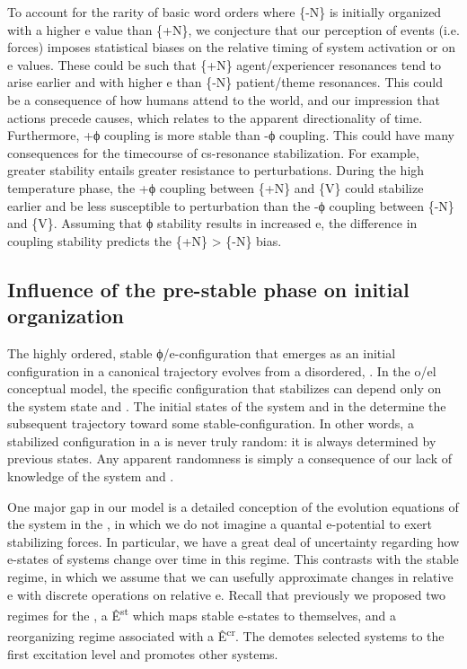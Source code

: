   To account for the rarity of basic word orders where \{-N\} is initially organized with a higher e value than \{+N\}, we conjecture that our perception of events (i.e.  forces) imposes statistical biases on the relative timing of system activation or on e values. These could be such that \{+N\} agent/experiencer resonances tend to arise earlier and with higher e than \{-N\} patient/theme resonances. This could be a consequence of how humans attend to the world, and our impression that actions precede causes, which relates to the apparent directionality of time. Furthermore, +ϕ coupling is more stable than -ϕ coupling. This could have many consequences for the timecourse of cs-resonance stabilization. For example, greater stability entails greater resistance to perturbations. During the high temperature phase, the +ϕ coupling between \{+N\} and \{V\} could stabilize earlier and be less susceptible to perturbation than the -ϕ coupling between \{-N\} and \{V\}. Assuming that ϕ stability results in increased e, the difference in coupling stability predicts the \{+N\} > \{-N\} bias.

\subsection{Influence of the pre-stable phase on initial organization}

The highly ordered, stable ϕ/e-con\-fig\-u\-ra\-tion that emerges as an initial configuration in a canonical trajectory evolves from a disordered, . In the o/el conceptual model, the specific configuration that stabilizes can depend only on the system state and . The initial states of the system and  in the  determine the subsequent trajectory toward some stable-con\-fig\-u\-ra\-tion. In other words, a stabilized configuration in a  is never truly random: it is always determined by previous states. Any apparent randomness is simply a consequence of our lack of knowledge of the system and .

  One major gap in our model is a detailed conception of the evolution equations of the system in the , in which we do not imagine a quantal e-potential to exert stabilizing forces. In particular, we have a great deal of uncertainty regarding how e-states of systems change over time in this regime. This contrasts with the stable regime, in which we assume that we can usefully approximate changes in relative e with discrete operations on relative e. Recall that previously we proposed two regimes for the , a  Ê\textsuperscript{st} which maps stable e-states to themselves, and a reorganizing regime associated with a  Ê\textsuperscript{cr}. The  demotes selected systems to the first excitation level and promotes other systems. 

